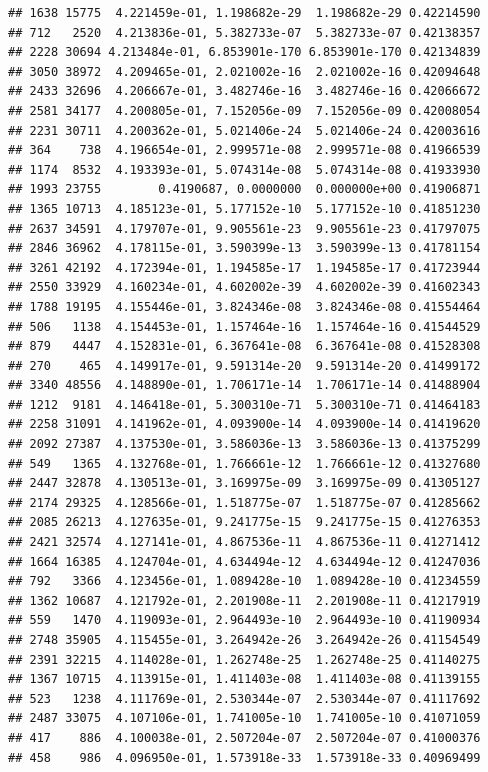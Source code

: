 \documentclass[
]{article}
\begin{document}
\begin{verbatim}
## 1638 15775  4.221459e-01, 1.198682e-29  1.198682e-29 0.42214590
## 712   2520  4.213836e-01, 5.382733e-07  5.382733e-07 0.42138357
## 2228 30694 4.213484e-01, 6.853901e-170 6.853901e-170 0.42134839
## 3050 38972  4.209465e-01, 2.021002e-16  2.021002e-16 0.42094648
## 2433 32696  4.206667e-01, 3.482746e-16  3.482746e-16 0.42066672
## 2581 34177  4.200805e-01, 7.152056e-09  7.152056e-09 0.42008054
## 2231 30711  4.200362e-01, 5.021406e-24  5.021406e-24 0.42003616
## 364    738  4.196654e-01, 2.999571e-08  2.999571e-08 0.41966539
## 1174  8532  4.193393e-01, 5.074314e-08  5.074314e-08 0.41933930
## 1993 23755        0.4190687, 0.0000000  0.000000e+00 0.41906871
## 1365 10713  4.185123e-01, 5.177152e-10  5.177152e-10 0.41851230
## 2637 34591  4.179707e-01, 9.905561e-23  9.905561e-23 0.41797075
## 2846 36962  4.178115e-01, 3.590399e-13  3.590399e-13 0.41781154
## 3261 42192  4.172394e-01, 1.194585e-17  1.194585e-17 0.41723944
## 2550 33929  4.160234e-01, 4.602002e-39  4.602002e-39 0.41602343
## 1788 19195  4.155446e-01, 3.824346e-08  3.824346e-08 0.41554464
## 506   1138  4.154453e-01, 1.157464e-16  1.157464e-16 0.41544529
## 879   4447  4.152831e-01, 6.367641e-08  6.367641e-08 0.41528308
## 270    465  4.149917e-01, 9.591314e-20  9.591314e-20 0.41499172
## 3340 48556  4.148890e-01, 1.706171e-14  1.706171e-14 0.41488904
## 1212  9181  4.146418e-01, 5.300310e-71  5.300310e-71 0.41464183
## 2258 31091  4.141962e-01, 4.093900e-14  4.093900e-14 0.41419620
## 2092 27387  4.137530e-01, 3.586036e-13  3.586036e-13 0.41375299
## 549   1365  4.132768e-01, 1.766661e-12  1.766661e-12 0.41327680
## 2447 32878  4.130513e-01, 3.169975e-09  3.169975e-09 0.41305127
## 2174 29325  4.128566e-01, 1.518775e-07  1.518775e-07 0.41285662
## 2085 26213  4.127635e-01, 9.241775e-15  9.241775e-15 0.41276353
## 2421 32574  4.127141e-01, 4.867536e-11  4.867536e-11 0.41271412
## 1664 16385  4.124704e-01, 4.634494e-12  4.634494e-12 0.41247036
## 792   3366  4.123456e-01, 1.089428e-10  1.089428e-10 0.41234559
## 1362 10687  4.121792e-01, 2.201908e-11  2.201908e-11 0.41217919
## 559   1470  4.119093e-01, 2.964493e-10  2.964493e-10 0.41190934
## 2748 35905  4.115455e-01, 3.264942e-26  3.264942e-26 0.41154549
## 2391 32215  4.114028e-01, 1.262748e-25  1.262748e-25 0.41140275
## 1367 10715  4.113915e-01, 1.411403e-08  1.411403e-08 0.41139155
## 523   1238  4.111769e-01, 2.530344e-07  2.530344e-07 0.41117692
## 2487 33075  4.107106e-01, 1.741005e-10  1.741005e-10 0.41071059
## 417    886  4.100038e-01, 2.507204e-07  2.507204e-07 0.41000376
## 458    986  4.096950e-01, 1.573918e-33  1.573918e-33 0.40969499

\end{verbatim}
\end{document}
